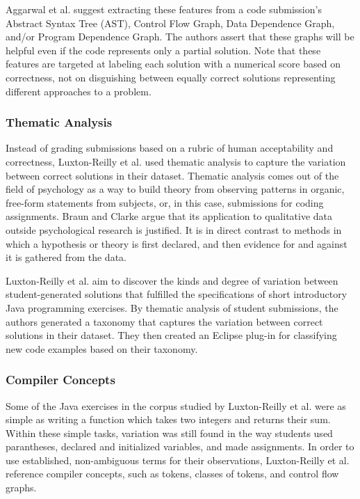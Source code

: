 \documentclass[12pt]{article}
\begin{document}
Aggarwal et al. suggest extracting these features from a code submission's Abstract Syntax Tree (AST), Control Flow Graph, Data Dependence Graph, and/or Program Dependence Graph. The authors assert that these graphs will be helpful even if the code represents only a partial solution. Note that these features are targeted at labeling each solution with a numerical score based on correctness, not on disguishing between equally correct solutions representing different approaches to a problem.


\subsubsection{Thematic Analysis}

Instead of grading submissions based on a rubric of human acceptability and correctness, Luxton-Reilly et al. \cite{Luxton13} used thematic analysis to capture the variation between correct solutions in their dataset. Thematic analysis comes out of the field of psychology as a way to build theory from observing patterns in organic, free-form statements from subjects, or, in this case, submissions for coding assignments. Braun and Clarke \cite{thematic06} argue that its application to qualitative data outside psychological research is justified. It is in direct contrast to methods in which a hypothesis or theory is first declared, and then evidence for and against it is gathered from the data. 

Luxton-Reilly et al. \cite{Luxton13} aim to discover the kinds and degree of variation between student-generated solutions that fulfilled the specifications of short introductory Java programming exercises . By thematic analysis of student submissions, the authors generated a taxonomy that captures the variation between correct solutions in their dataset. They then created an Eclipse plug-in for classifying new code examples based on their taxonomy. 

\subsubsection{Compiler Concepts}

Some of the Java exercises in the corpus studied by Luxton-Reilly et al. \cite{Luxton13} were as simple as writing a function which takes two integers and returns their sum. Within these simple tasks, variation was still found in the way students used parantheses, declared and initialized variables, and made assignments. In order to use established, non-ambiguous terms for their observations, Luxton-Reilly et al. reference compiler concepts, such as tokens, classes of tokens, and control flow graphs. 
\end{document}
